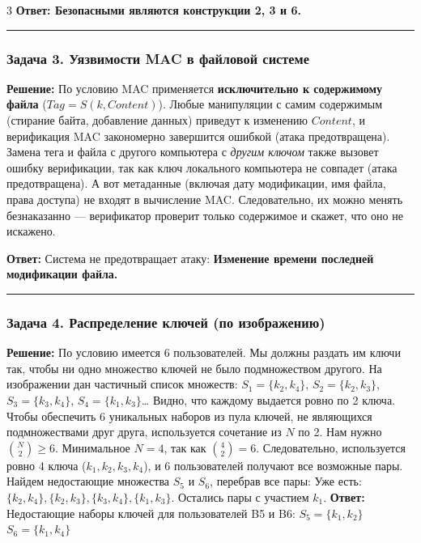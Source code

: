 ﻿\documentclass[9pt,a4paper,landscape]{extarticle}
\begin{document}
\begin{multicols*}{3}
\textbf{Ответ: Безопасными являются конструкции 2, 3 и 6.}

\begin{center}\rule{0.5\linewidth}{0.5pt}\end{center}

\subsubsection{Задача 3. Уязвимости MAC в файловой системе}\label{ux437ux430ux434ux430ux447ux430-3.-ux443ux44fux437ux432ux438ux43cux43eux441ux442ux438-mac-ux432-ux444ux430ux439ux43bux43eux432ux43eux439-ux441ux438ux441ux442ux435ux43cux435}

\textbf{Решение:} По условию MAC применяется \textbf{исключительно к содержимому файла} (\(Tag = S(k, Content)\)). Любые манипуляции с самим содержимым (стирание байта, добавление данных) приведут к изменению \(Content\), и верификация MAC закономерно завершится ошибкой (атака предотвращена). Замена тега и файла с другого компьютера с \emph{другим ключом} также вызовет ошибку верификации, так как ключ локального компьютера не совпадет (атака предотвращена). А вот метаданные (включая дату модификации, имя файла, права доступа) не входят в вычисление MAC. Следовательно, их можно менять безнаказанно --- верификатор проверит только содержимое и скажет, что оно не искажено.

\textbf{Ответ:} Система не предотвращает атаку: \textbf{Изменение времени последней модификации файла.}

\begin{center}\rule{0.5\linewidth}{0.5pt}\end{center}

\subsubsection{Задача 4. Распределение ключей (по изображению)}\label{ux437ux430ux434ux430ux447ux430-4.-ux440ux430ux441ux43fux440ux435ux434ux435ux43bux435ux43dux438ux435-ux43aux43bux44eux447ux435ux439-ux43fux43e-ux438ux437ux43eux431ux440ux430ux436ux435ux43dux438ux44e}

\textbf{Решение:} По условию имеется 6 пользователей. Мы должны раздать им ключи так, чтобы ни одно множество ключей не было подмножеством другого. На изображении дан частичный список множеств: \(S_1 = \{k_2, k_4\}\), \(S_2 = \{k_2, k_3\}\), \(S_3 = \{k_3, k_4\}\), \(S_4 = \{k_1, k_3\}\)\ldots{} Видно, что каждому выдается ровно по 2 ключа. Чтобы обеспечить 6 уникальных наборов из пула ключей, не являющихся подмножествами друг друга, используется сочетание из \(N\) по 2. Нам нужно \(\binom{N}{2} \ge 6\). Минимальное \(N=4\), так как \(\binom{4}{2} = 6\). Следовательно, используется ровно 4 ключа (\(k_1, k_2, k_3, k_4\)), и 6 пользователей получают все возможные пары. Найдем недостающие множества \(S_5\) и \(S_6\), перебрав все пары: Уже есть: \(\{k_2, k_4\}, \{k_2, k_3\}, \{k_3, k_4\}, \{k_1, k_3\}\). Остались пары с участием \(k_1\). \textbf{Ответ:} Недостающие наборы ключей для пользователей B5 и B6: \textbf{\(S_5 = \{k_1, k_2\}\)} \textbf{\(S_6 = \{k_1, k_4\}\)}


\end{multicols*}
\end{document}
